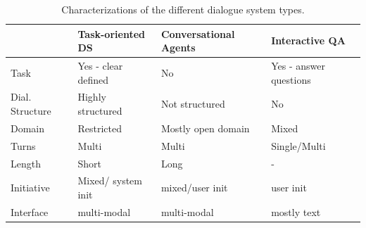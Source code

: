 \begin{table}[h!]
\centering
\begin{tabular}{l||lll}
                & Task-oriented DS    & Conversational Agents & Interactive QA         \\ \hline \hline
Task            & Yes - clear defined & No                    & Yes - answer questions \\
Dial. Structure & Highly structured     & Not structured        & No                     \\
Domain          & Restricted          & Mostly open domain    & Mixed                  \\
Turns           & Multi               & Multi                 & Single/Multi           \\
Length          & Short               & Long                  & -                      \\
Initiative      & Mixed/ system init  & mixed/user init       & user init              \\
Interface       & multi-modal         & multi-modal           & mostly text           
\end{tabular}
\caption{Characterizations of the different dialogue system types. }
\label{tbl:ds_char}
\end{table}

